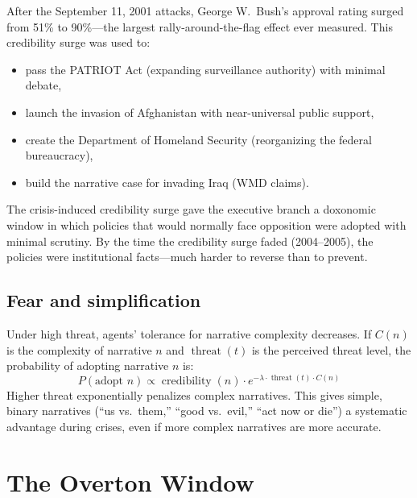 \begin{example}
\label{ex:rally-flag}
After the September 11, 2001 attacks, George W.\ Bush's approval rating surged from 51\% to 90\%---the largest rally-around-the-flag effect ever measured.
This credibility surge was used to:
\begin{itemize}[nosep]
  \item pass the PATRIOT Act (expanding surveillance authority) with minimal debate,
  \item launch the invasion of Afghanistan with near-universal public support,
  \item create the Department of Homeland Security (reorganizing the federal bureaucracy),
  \item build the narrative case for invading Iraq (WMD claims).
\end{itemize}
The crisis-induced credibility surge gave the executive branch a doxonomic window in which policies that would normally face opposition were adopted with minimal scrutiny.
By the time the credibility surge faded (2004--2005), the policies were institutional facts---much harder to reverse than to prevent.
\end{example}

\subsection{Fear and simplification}

\begin{proposition}
\label{prop:fear-complexity}
Under high threat, agents' tolerance for narrative complexity decreases.
If $C(n)$ is the complexity of narrative $n$ and $\operatorname{threat}(t)$ is the perceived threat level, the probability of adopting narrative $n$ is:
\[
  P(\text{adopt } n) \propto \operatorname{credibility}(n) \cdot e^{-\lambda \cdot \operatorname{threat}(t) \cdot C(n)}
\]
Higher threat exponentially penalizes complex narratives.
This gives simple, binary narratives (``us vs.\ them,'' ``good vs.\ evil,'' ``act now or die'') a systematic advantage during crises, even if more complex narratives are more accurate.
\end{proposition}

\section{The Overton Window}
\label{sec:ch29-overton}

